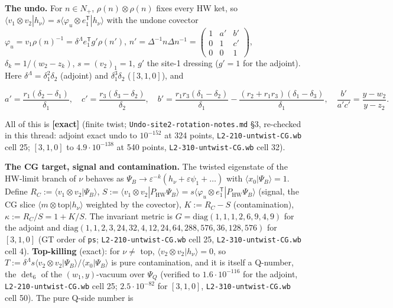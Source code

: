 \documentclass[10pt]{article}
\newcommand{\nb}[1]{\texttt{#1}}
\begin{document}
\textbf{The undo.} For $n\in N_+$, $\rho(n)\otimes\rho(n)$ fixes every HW ket, so $\langle v_1\otimes v_2|h_\nu\rangle=s\langle\varphi_u\otimes e_1^{\mathsf T}|h_\nu\rangle$ with the undone covector $\varphi_u=v_1\rho(n)^{-1}=\delta^\Lambda e_1^{\mathsf T}g'\rho(n')$, $n'=\Delta^{-1}n\Delta n^{-1}=\begin{pmatrix}1&a'&b'\\0&1&c'\\0&0&1\end{pmatrix}$, $\delta_k=1/(w_2-z_k)$, $s=(v_2)_1=1$, $g'$ the site-1 dressing ($g'=1$ for the adjoint). Here $\delta^\Lambda=\delta_1^2\delta_2$ (adjoint) and $\delta_1^3\delta_2$ ($[3,1,0]$), and

\[
a'=\frac{r_1(\delta_2-\delta_1)}{\delta_1},\quad c'=\frac{r_3(\delta_3-\delta_2)}{\delta_2},\quad b'=\frac{r_1r_3(\delta_1-\delta_2)}{\delta_1}-\frac{(r_2+r_1r_3)(\delta_1-\delta_3)}{\delta_1},\quad \frac{b'}{a'c'}=\frac{y-w_2}{y-z_2}.
\]

All of this is \textbf{[exact]} (finite twist; \nb{Undo-\allowbreak{}site2-\allowbreak{}rotation-\allowbreak{}notes.\allowbreak{}md} \S{}3, re-checked in this thread: adjoint exact undo to $10^{-152}$ at 324 points, \nb{L2-\allowbreak{}210-\allowbreak{}untwist-\allowbreak{}CG.\allowbreak{}wb} cell 25; $[3,1,0]$ to $4.9\cdot10^{-138}$ at 540 points, \nb{L2-\allowbreak{}310-\allowbreak{}untwist-\allowbreak{}CG.\allowbreak{}wb} cell 32).

\textbf{The CG target, signal and contamination.} The twisted eigenstate of the HW-limit branch of $\nu$ behaves as $\Psi_B\to\varepsilon^{-k}(h_\nu+\varepsilon\psi_1+\dots)$ with $\langle x_0|\Psi_B\rangle=1$. Define $R_C:=\langle v_1\otimes v_2|\Psi_B\rangle$, $S:=\langle v_1\otimes v_2|P_{\mathrm{HW}}\Psi_B\rangle=s\langle\varphi_u\otimes e_1^{\mathsf T}|P_{\mathrm{HW}}\Psi_B\rangle$ (signal, the CG slice $\langle m\otimes\mathrm{top}|h_\nu\rangle$ weighted by the covector), $K:=R_C-S$ (contamination), $\kappa:=R_C/S=1+K/S$. The invariant metric is $G=\mathrm{diag}(1,1,1,2,6,9,4,9)$ for the adjoint and $\mathrm{diag}(1,1,2,3,24,32,4,12,24,64,288,576,36,128,576)$ for $[3,1,0]$ (GT order of \nb{ps}; \nb{L2-\allowbreak{}210-\allowbreak{}untwist-\allowbreak{}CG.\allowbreak{}wb} cell 25, \nb{L2-\allowbreak{}310-\allowbreak{}untwist-\allowbreak{}CG.\allowbreak{}wb} cell 4). \textbf{Top-killing} (exact): for $\nu\ne$ top, $\langle v_2\otimes v_2|h_\nu\rangle=0$, so $T:=\delta^\Lambda s\langle v_2\otimes v_2|\Psi_B\rangle/\langle x_0|\Psi_B\rangle$ is pure contamination, and it is itself a Q-number, the $\det_6$ of the $(w_1,y)$-vacuum over $\Psi_Q$ (verified to $1.6\cdot10^{-116}$ for the adjoint, \nb{L2-\allowbreak{}210-\allowbreak{}untwist-\allowbreak{}CG.\allowbreak{}wb} cell 25; $2.5\cdot10^{-82}$ for $[3,1,0]$, \nb{L2-\allowbreak{}310-\allowbreak{}untwist-\allowbreak{}CG.\allowbreak{}wb} cell 50). The pure Q-side number is
\end{document}
